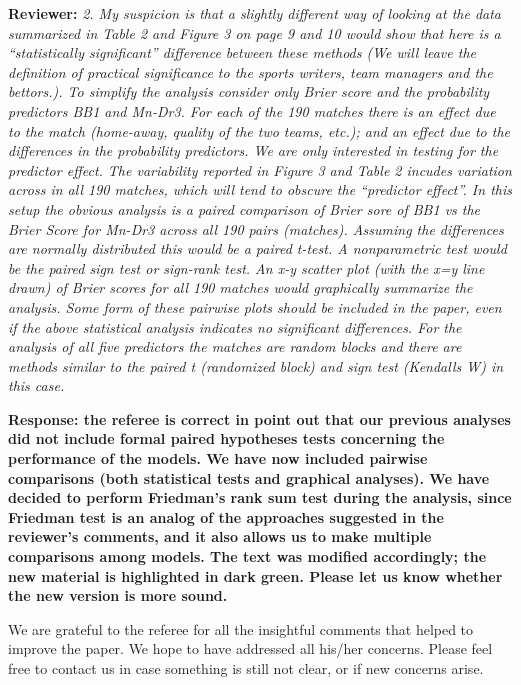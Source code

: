 \documentclass[11pt]{article}
\begin{document}
\vspace{6mm}

\hspace{4mm} \textbf{Reviewer:} \textit{2. My suspicion is that a slightly different way of looking at the data summarized in
Table 2 and Figure 3 on page 9 and 10 would show that here is a ``statistically significant'' difference between these methods (We will leave the definition of practical significance
to the sports writers, team managers and the bettors.). To simplify the analysis consider only Brier score and the probability predictors BB1 and Mn-Dr3. For each of the 190 matches there is an effect due to the match (home-away, quality of the two teams, etc.); and an effect due to the differences in the probability predictors. We are only interested in testing for the predictor effect. The variability reported in Figure 3 and Table 2
incudes variation across in all 190 matches, which will tend to obscure the ``predictor effect''. In this setup the obvious analysis is a paired comparison of Brier sore of BB1 vs the Brier Score for Mn-Dr3 across all 190 pairs (matches). Assuming the differences
are normally distributed this would be a paired t-test. A nonparametric test would be the paired sign test or sign-rank test. An x-y scatter plot (with the x=y line drawn) of Brier scores for all 190 matches would graphically summarize the analysis. Some form of
these pairwise plots should be included in the paper, even if the above statistical analysis indicates no significant differences.
For the analysis of all five predictors the matches are random blocks and there are methods similar to the paired t (randomized block) and sign test (Kendalls W) in this case.}

\vspace{2mm}
{\bf Response: the referee is correct in point out that our previous analyses did not include formal paired hypotheses tests concerning the performance of the models. We have now included pairwise comparisons (both statistical tests and graphical analyses). We have decided to perform Friedman's rank sum test during the analysis, since Friedman test is an analog of the approaches suggested in the reviewer's comments, and it also allows us to make multiple comparisons among models.  The text was modified accordingly; the new material is highlighted in dark green. Please let us know whether the new version is more sound.

We are grateful to the referee for all the insightful comments that helped to improve the paper. We hope to have addressed all his/her concerns. Please feel free to contact us in case something is still not clear, or if new concerns arise.} 
\end{document}
